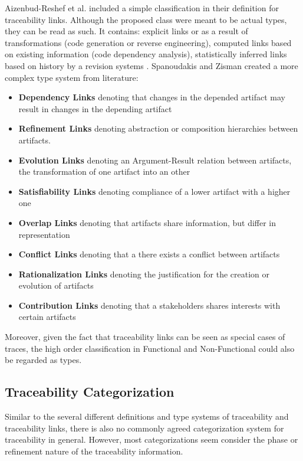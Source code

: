 \documentclass[runningheads,a4paper]{llncs}
\begin{document}
Aizenbud-Reshef et al.\cite{Aizenbud-Reshef} included a simple classification in their definition for traceability links.
Although the proposed class were meant to be actual types, they can be read as such. 
It contains: 
 explicit links or as a result of transformations (code generation or reverse engineering),
 computed links  based on existing information (code dependency analysis),
 statistically inferred links based on history by a revision systems \cite{TraceabilitySurvey}.
Spanoudakis and Zisman \cite{SpanoudakisAndZisman} created a more complex type system from literature:
\begin{itemize}

\item
\textbf{Dependency Links}
denoting that changes in the depended artifact may result in changes in the depending artifact

\item
\textbf{Refinement Links}
denoting abstraction or composition hierarchies between artifacts.

\item
\textbf{Evolution Links}
denoting an Argument-Result relation between artifacts, the transformation of one artifact into an other

\item
\textbf{Satisfiability Links}
denoting compliance of a lower artifact with a higher one

\item
\textbf{Overlap Links}
denoting that artifacts share information, but differ in representation

\item
\textbf{Conflict Links}
denoting that a there exists a conflict between artifacts

\item
\textbf{Rationalization Links}
denoting the justification for the creation or evolution of artifacts

\item
\textbf{Contribution Links}
denoting that a stakeholders shares interests with certain artifacts

\end{itemize}

Moreover, given the fact that traceability links can be seen as special cases of traces, the high order classification in Functional and Non-Functional could also be regarded as types.




\subsection{Traceability Categorization}
\label{subsec:Traceability-Link-Categorization:}
Similar to the several different definitions and type systems of traceability and traceability links, there is also no commonly agreed categorization system for traceability in general.
However, most categorizations seem consider the phase or refinement nature of the traceability information.
\end{document}
